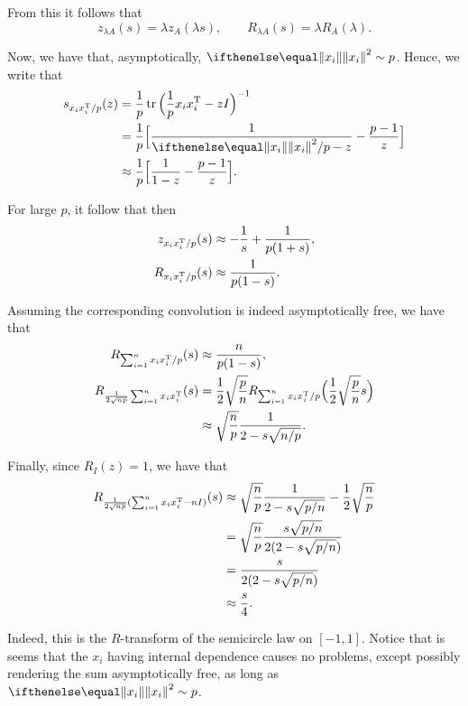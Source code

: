 \documentclass{hw-scrartcl}
\begin{document}
From this it follows that
\[
  z_{\lambda A}(s) = \lambda z_A(\lambda s),
  \qquad
  R_{\lambda A}(s) = \lambda R_A(\lambda).
\]

Now, we have that, asymptotically, \(\norm{x_i}^2 \sim p\). Hence, we write that
\begin{align*}
  s_{x_i x_i\transp/p}(z)
  &= \frac{1}{p}\Tr\Big(\frac{1}{p}x_i x_i\transp - z\Id\Big)^{-1} \\
  &= \frac{1}{p}\Big[\frac{1}{\norm{x_i}^2/p - z} - \frac{p-1}{z}\Big] \\
  &\approx \frac{1}{p}\Big[\frac{1}{1 - z} - \frac{p-1}{z}\Big].
\end{align*}

For large \(p\), it follow that then
\begin{align*}
  z_{x_i x_i^{\mathrm{T}}/p}(s)
  &\approx -\frac{1}{s} + \frac{1}{p(1 + s)}, \\
  R_{x_i x_i^{\mathrm{T}}/p}(s)
  &\approx \frac{1}{p(1 - s)}.
\end{align*}

Assuming the corresponding convolution is indeed asymptotically free, we have that
\begin{align*}
  R_{\sum_{i=1}^n x_i x_i^{\mathrm{T}}/p}(s)
  &\approx \frac{n}{p(1-s)}, \\
  R_{\frac{1}{2\sqrt{np}}\sum_{i=1}^n x_i x_i^{\mathrm{T}}}(s)
  &= \frac{1}{2}\sqrt{\frac{p}{n}} R_{\sum_{i=1}^n x_i x_i^{\mathrm{T}}/p}\Big(\frac{1}{2}\sqrt{\frac{p}{n}}s\Big) \\
  &\approx  \sqrt{\frac{n}{p}}\frac{1}{2 - s\sqrt{n/p}}.
\end{align*}

Finally, since \(R_I(z) = 1\), we have that
\begin{align*}
  R_{\frac{1}{2\sqrt{np}}(\sum_{i=1}^n x_i x_i^{\mathrm{T}} - nI)}(s)
  &\approx \sqrt{\frac{n}{p}}\frac{1}{2 - s\sqrt{p/n}} - \frac{1}{2}\sqrt{\frac{n}{p}} \\
  &= \sqrt{\frac{n}{p}} \frac{s\sqrt{p/n}}{2(2 - s\sqrt{p/n})}\\
  &= \frac{s}{2(2 - s\sqrt{p/n})} \\
  &\approx \frac{s}{4}.
\end{align*}

Indeed, this is the \(R\)-transform of the semicircle law on \([-1, 1]\). Notice that is seems that the \(x_i\) having internal dependence causes no problems, except possibly rendering the sum asymptotically free, as long as \(\norm{x_i}^2 \sim p\).
\end{document}
